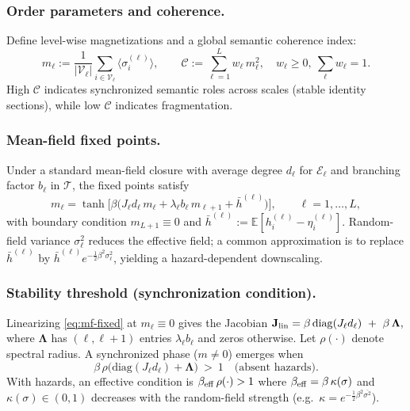 \documentclass[a4paper,11pt]{article}
\begin{document}
\subsubsection{Order parameters and coherence.}
Define level-wise magnetizations and a global semantic coherence index:
\begin{equation}
m_\ell := \frac{1}{|\mathcal{V}_\ell|}\sum_{i\in\mathcal{V}_\ell}\!\langle \sigma_i^{(\ell)}\rangle,
\qquad
\mathcal{C} := \sum_{\ell=1}^L w_\ell\,m_\ell^2,\quad w_\ell\ge 0,\ \sum_\ell w_\ell=1.
\end{equation}
High $\mathcal{C}$ indicates synchronized semantic roles across scales (stable
identity sections), while low $\mathcal{C}$ indicates fragmentation.

\subsubsection{Mean-field fixed points.}
Under a standard mean-field closure with average degree $d_\ell$ for
$\mathcal{E}_\ell$ and branching factor $b_\ell$ in $\mathcal{T}$, the fixed
points satisfy
\begin{equation}
\label{eq:mf-fixed}
m_\ell
=
\tanh\!\Big[
  \beta \big(J_\ell d_\ell\, m_\ell + \lambda_\ell b_\ell\, m_{\ell+1}
  + \bar{h}^{(\ell)}\big)
\Big],
\qquad \ell=1,\dots,L,
\end{equation}
with boundary condition $m_{L+1}\equiv 0$ and
$\bar{h}^{(\ell)}:=\mathbb{E}[h_i^{(\ell)}-\eta_i^{(\ell)}]$.
Random-field variance $\sigma_\ell^2$ reduces the effective field; a common
approximation is to replace $\bar{h}^{(\ell)}$ by
$\bar{h}^{(\ell)} e^{-\frac{1}{2}\beta^2\sigma_\ell^2}$, yielding a
hazard-dependent downscaling.

\subsubsection{Stability threshold (synchronization condition).}
Linearizing \eqref{eq:mf-fixed} at $m_\ell\equiv 0$ gives the Jacobian
\(
\mathbf{J}_{\rm lin}=\beta\,\mathrm{diag}(J_\ell d_\ell)\ +\
\beta\,\mathbf{\Lambda},
\)
where $\mathbf{\Lambda}$ has $(\ell,\ell{+}1)$ entries
$\lambda_\ell b_\ell$ and zeros otherwise. Let
$\rho(\cdot)$ denote spectral radius. A synchronized phase ($m\neq 0$) emerges
when
\begin{equation}
\label{eq:sync-threshold}
\beta\,\rho\!\big(\mathrm{diag}(J_\ell d_\ell)+\mathbf{\Lambda}\big)
\ >\ 1
\quad\text{(absent hazards).}
\end{equation}
With hazards, an effective condition is
\(
\beta_{\rm eff}\,\rho(\cdot)>1
\)
where $\beta_{\rm eff}=\beta\,\kappa(\sigma)$ and
$\kappa(\sigma)\in(0,1)$ decreases with the random-field strength
(e.g.\ $\kappa= e^{-\frac{1}{2}\beta^2 \overline{\sigma^2}}$).
\end{document}
